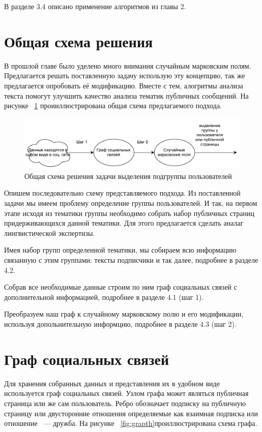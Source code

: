 \documentclass[annotation,times,page4]{itmo-student-thesis}
\begin{document}
В разделе 3.4 описано применение алгоритмов из главы 2.

\section{Общая схема решения}
В прошлой главе было уделено много внимания случайным марковским полям. Предлагается решать поставленную задачу использую эту концепцию, так же предлагается опробовать её модификацию. Вместе с тем, алогритмы анализа текста помогут улучшить качество анализа тематик публичных сообщений. На рисунке ~\ref{fig:plan} проииллюстрирована общая схема предлагаемого подхода.

\begin{figure}[!h]
\caption{Общая схема решения задачи выделения подгруппы пользователей}
\label{fig:plan}
\centering
\includegraphics[width=\textwidth]{figs/plan.pdf}
\end{figure}

Опишем последовательно схему представляемого подхода. Из поставленной задачи мы имеем проблему определение группы пользователей. И так, на первом этапе исходя из тематики группы необходимо собрать набор публичных страниц придерживающихся данной тематики. Для этого предлагается сделать аналаг лингвистической экспертизы. 

Имея набор групп определенной тематики, мы собираем всю информацию связанную с этим группами: тексты подписчики и так далее, подробнее в разделе 4.2.

Собрав все необходимые данные строим по ним граф социальных связей с дополнительной информацией, подробнее в разделе 4.1 (шаг 1).

Преобразуем наш граф к случайному марковскому полю и его модификации, используя допольнительную информцию, подробнее в разделе 4.3 (шаг 2).

\section{Граф социальных связей}
Для хранения собранных данных и представления их в удобном виде используется граф социальных связей.
Узлом графа может являться публичная страница или же сам пользователь. Ребро обозначает подписку на публичную страницу или двусторонние отношения определяемые как взаимная подписка или отношение ~--- дружба. На рисунке ~\ref{fig:grapth}проиллюстрирована схема графа.
\end{document}
